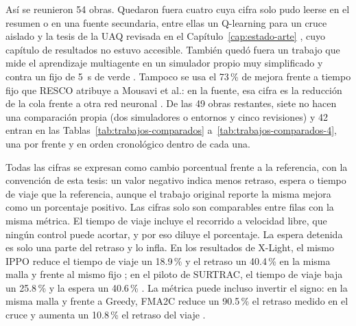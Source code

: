 Así se reunieron 54 obras. Quedaron fuera cuatro cuya cifra solo pudo
leerse en el resumen o en una fuente secundaria, entre ellas un
Q-learning para un cruce aislado \citep{Abdulhai2003_QLearning} y la
tesis de la UAQ revisada en el Capítulo~\ref{cap:estado-arte}
\citep{UAQ2024}, cuyo capítulo de resultados no estuvo accesible.
También quedó fuera un trabajo que mide el aprendizaje multiagente en un
simulador propio muy simplificado y contra un fijo de 5~s de verde
\citep{Mahato2025_MARLvsFijo}. Tampoco se usa el 73\,\% de mejora frente
a tiempo fijo que RESCO \citep{Ault2021_RESCO} atribuye a Mousavi et al.: en la fuente, esa
cifra es la reducción de la cola frente a otra red neuronal
\citep{Mousavi2017_PGDQN}. De las 49 obras restantes, siete no hacen una
comparación propia (dos simuladores o entornos y cinco revisiones) y 42
entran en las Tablas~\ref{tab:trabajos-comparados}
a~\ref{tab:trabajos-comparados-4}, una por frente y en orden
cronológico dentro de cada una.

Todas las cifras se expresan como cambio porcentual frente a la
referencia, con la convención de esta tesis: un valor negativo indica
menos retraso, espera o tiempo de viaje que la referencia, aunque el
trabajo original reporte la misma mejora como un porcentaje positivo.
Las cifras solo son comparables entre filas con la misma métrica. El
tiempo de viaje incluye el recorrido a velocidad libre, que ningún
control puede acortar, y por eso diluye el porcentaje. La espera
detenida es solo una parte del retraso y lo infla. En los resultados de
X-Light, el mismo IPPO reduce el tiempo de viaje un 18.9\,\% y el
retraso un 40.4\,\% en la misma malla y frente al mismo fijo
\citep{Jiang2024_XLight}; en el piloto de
SURTRAC, el tiempo de viaje baja un 25.8\,\% y la espera un 40.6\,\%
\citep{Smith2013_Surtrac}. La métrica puede incluso invertir el signo:
en la misma malla y frente a Greedy, FMA2C reduce un 90.5\,\% el retraso
medido en el cruce y aumenta un 10.8\,\% el retraso del viaje
\citep{Ma2020_FMA2C}.

